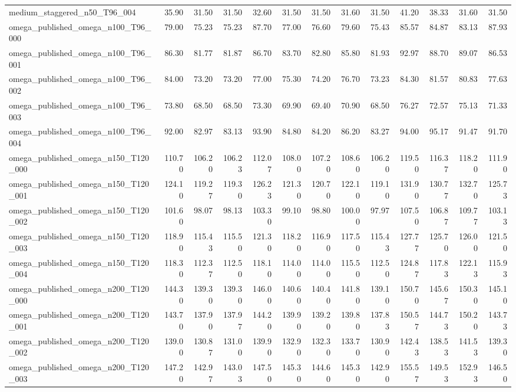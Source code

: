 \begin{table}[htbp]
\begin{tabular}{lrrrrrrrrrrrr}
medium\_staggered\_n50\_T96\_004 & 35.90 & 31.50 & 31.50 & 32.60 & 31.50 & 31.50 & 31.60 & 31.50 & 41.20 & 38.33 & 31.60 & 31.50 \\
omega\_published\_omega\_n100\_T96\_000 & 79.00 & 75.23 & 75.23 & 87.70 & 77.00 & 76.60 & 79.60 & 75.43 & 85.57 & 84.87 & 83.13 & 87.93 \\
omega\_published\_omega\_n100\_T96\_001 & 86.30 & 81.77 & 81.87 & 86.70 & 83.70 & 82.80 & 85.80 & 81.93 & 92.97 & 88.70 & 89.07 & 86.53 \\
omega\_published\_omega\_n100\_T96\_002 & 84.00 & 73.20 & 73.20 & 77.00 & 75.30 & 74.20 & 76.70 & 73.23 & 84.30 & 81.57 & 80.83 & 77.63 \\
omega\_published\_omega\_n100\_T96\_003 & 73.80 & 68.50 & 68.50 & 73.30 & 69.90 & 69.40 & 70.90 & 68.50 & 76.27 & 72.57 & 75.13 & 71.33 \\
omega\_published\_omega\_n100\_T96\_004 & 92.00 & 82.97 & 83.13 & 93.90 & 84.80 & 84.20 & 86.20 & 83.27 & 94.00 & 95.17 & 91.47 & 91.70 \\
omega\_published\_omega\_n150\_T120\_000 & 110.70 & 106.20 & 106.23 & 112.07 & 108.00 & 107.20 & 108.60 & 106.20 & 119.50 & 116.37 & 118.20 & 111.90 \\
omega\_published\_omega\_n150\_T120\_001 & 124.10 & 119.27 & 119.30 & 126.23 & 121.30 & 120.70 & 122.10 & 119.10 & 131.90 & 130.77 & 132.70 & 125.73 \\
omega\_published\_omega\_n150\_T120\_002 & 101.60 & 98.07 & 98.13 & 103.30 & 99.10 & 98.80 & 100.00 & 97.97 & 107.50 & 106.87 & 109.77 & 103.13 \\
omega\_published\_omega\_n150\_T120\_003 & 118.90 & 115.43 & 115.50 & 121.30 & 118.20 & 116.90 & 117.50 & 115.43 & 127.77 & 125.70 & 126.00 & 121.50 \\
omega\_published\_omega\_n150\_T120\_004 & 118.30 & 112.37 & 112.50 & 118.10 & 114.00 & 114.00 & 115.50 & 112.50 & 124.87 & 117.83 & 122.13 & 115.93 \\
omega\_published\_omega\_n200\_T120\_000 & 144.30 & 139.30 & 139.30 & 146.00 & 140.60 & 140.40 & 141.80 & 139.10 & 150.70 & 145.67 & 150.30 & 145.10 \\
omega\_published\_omega\_n200\_T120\_001 & 143.70 & 137.90 & 137.97 & 144.20 & 139.90 & 139.20 & 139.80 & 137.83 & 150.57 & 144.73 & 150.20 & 143.73 \\
omega\_published\_omega\_n200\_T120\_002 & 139.00 & 130.87 & 131.00 & 139.90 & 132.90 & 132.30 & 133.70 & 130.90 & 142.43 & 138.53 & 141.53 & 139.30 \\
omega\_published\_omega\_n200\_T120\_003 & 147.20 & 142.97 & 143.03 & 147.50 & 145.30 & 144.60 & 145.30 & 142.90 & 155.57 & 149.53 & 152.93 & 146.50 \\

\end{tabular}
\end{table}
